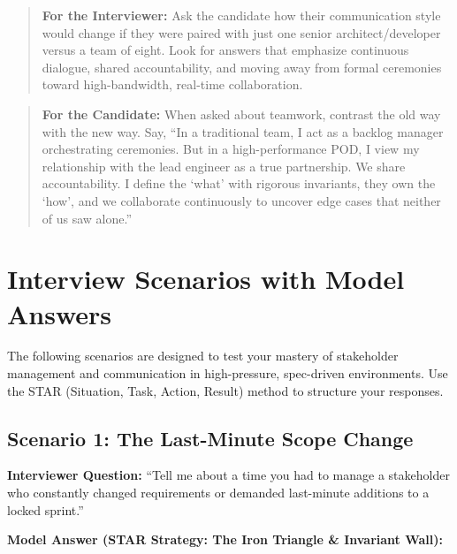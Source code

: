 \begin{quote}
\textbf{For the Interviewer:} Ask the candidate how their communication
style would change if they were paired with just one senior
architect/developer versus a team of eight. Look for answers that
emphasize continuous dialogue, shared accountability, and moving away
from formal ceremonies toward high-bandwidth, real-time collaboration.
\end{quote}

\begin{quote}
\textbf{For the Candidate:} When asked about teamwork, contrast the old
way with the new way. Say, ``In a traditional team, I act as a backlog
manager orchestrating ceremonies. But in a high-performance POD, I view
my relationship with the lead engineer as a true partnership. We share
accountability. I define the `what' with rigorous invariants, they own
the `how', and we collaborate continuously to uncover edge cases that
neither of us saw alone.''
\end{quote}

\bigskip

\section{Interview Scenarios with Model
Answers}\label{interview-scenarios-with-model-answers}

The following scenarios are designed to test your mastery of stakeholder
management and communication in high-pressure, spec-driven environments.
Use the STAR (Situation, Task, Action, Result) method to structure your
responses.

\subsection{Scenario 1: The Last-Minute Scope
Change}\label{scenario-1-the-last-minute-scope-change}

\textbf{Interviewer Question:} ``Tell me about a time you had to manage
a stakeholder who constantly changed requirements or demanded
last-minute additions to a locked sprint.''

\textbf{Model Answer (STAR Strategy: The Iron Triangle \& Invariant
Wall):}

